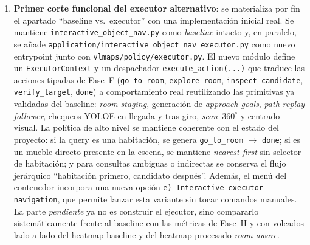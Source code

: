 \begin{enumerate}
  \item \textbf{Primer corte funcional del executor alternativo}: se materializa
        por fin el apartado ``baseline vs.\ executor'' con una implementación
        inicial real. Se mantiene \texttt{interactive\_object\_nav.py} como
        \emph{baseline} intacto y, en paralelo, se añade
        \texttt{application/interactive\_object\_nav\_executor.py} como nuevo
        entrypoint junto con \texttt{vlmaps/policy/executor.py}. El nuevo
        módulo define un \texttt{ExecutorContext} y un despachador
        \texttt{execute\_action(...)} que traduce las acciones tipadas de
        Fase~F (\texttt{go\_to\_room}, \texttt{explore\_room},
        \texttt{inspect\_candidate}, \texttt{verify\_target},
        \texttt{done}) a comportamiento real reutilizando las primitivas ya
        validadas del baseline: \textit{room staging}, generación de
        \emph{approach goals}, \textit{path replay follower}, chequeos YOLOE
        en llegada y tras giro, \textit{scan}~$360^\circ$ y centrado visual.
        La política de alto nivel se mantiene coherente con el estado del
        proyecto: si la query es una habitación, se genera
        \texttt{go\_to\_room} $\rightarrow$ \texttt{done}; si es un mueble
        directo presente en la escena, se mantiene \textit{nearest-first}
        sin selector de habitación; y para consultas ambiguas o indirectas se
        conserva el flujo jerárquico ``habitación primero, candidato después''.
        Además, el menú del contenedor incorpora una nueva opción
        \texttt{e) Interactive executor navigation}, que permite lanzar esta
        variante sin tocar comandos manuales. La parte \emph{pendiente} ya no
        es construir el ejecutor, sino compararlo sistemáticamente frente al
        baseline con las métricas de Fase~H y con volcados lado a lado del
        heatmap baseline y del heatmap procesado \emph{room-aware}.


\end{enumerate}
